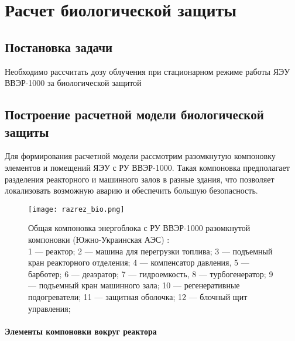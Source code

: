 \section{Расчет биологической защиты} %
\subsection{Постановка задачи}
Необходимо рассчитать дозу облучения при стационарном режиме работы ЯЭУ ВВЭР-1000 за биологической защитой

\subsection{Построение расчетной модели биологической защиты}
Для формирования расчетной модели рассмотрим разомкнутую компоновку элементов и помещений ЯЭУ с РУ ВВЭР-1000. Такая компоновка предполагает разделения реакторного и машинного залов в разные здания, что позволяет локализовать возможную аварию и обеспечить большую безопасность.

\begin{figure}[H]
	\begin{center}
		\texttt{[image: razrez\_bio.png]}
		\caption{
			Общая компоновка энергоблока с РУ ВВЭР-1000 разомкнутой компоновки (Южно-Украинская АЭС) \cite{МонаховА.С1986Аэси}: \\
			1 — реактор; 2 — машина для перегрузки топлива; 3 — подъемный кран реакторного отделения; 4 — компенсатор давления, 5 — барботер; 6 — деаэратор; 7 — гидроемкость, 8 — турбогенератор; 9 — подъемный кран машинного зала; 10 — регенеративные подогреватели; 11 — защитная оболочка; 12 — блочный щит управления;
		}
		\label{pic:razrez_bio} %
	\end{center}
\end{figure}

\paragraph{Элементы компоновки вокруг реактора}

